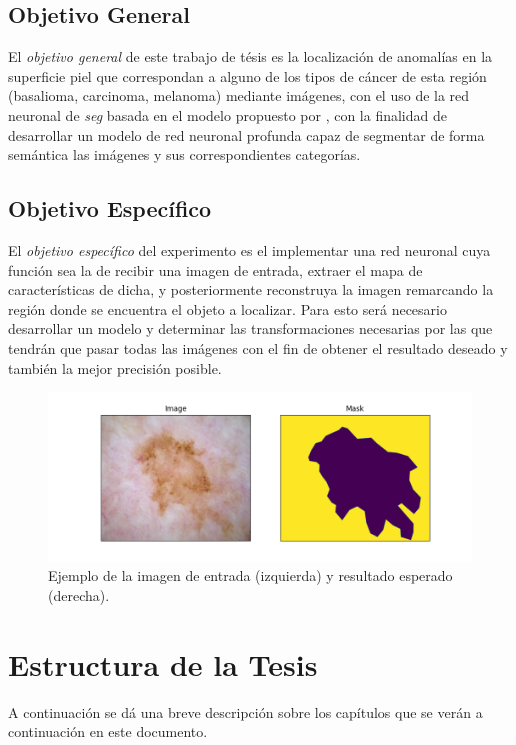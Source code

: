 \subsection{Objetivo General}
El \emph{objetivo general} de este trabajo de tésis es la localización de anomalías en la superficie piel que correspondan a alguno de los tipos de cáncer de esta región (basalioma, carcinoma, melanoma) mediante imágenes, con el uso de la red neuronal de \emph{\gls{seg}} basada en el modelo propuesto por \citet{wu2019fastfcn}, con la finalidad de desarrollar un modelo de red neuronal profunda capaz de segmentar de forma semántica las imágenes y sus correspondientes categorías.
\subsection{Objetivo Específico}
El \emph{objetivo específico} del experimento es el implementar una red neuronal cuya función sea la de recibir una imagen de entrada, extraer el mapa de características de dicha, y posteriormente reconstruya la imagen remarcando la región donde se encuentra el objeto a localizar. Para esto será necesario desarrollar un modelo y determinar las transformaciones necesarias por las que tendrán que pasar todas las imágenes con el fin de obtener el resultado deseado y también la mejor precisión posible.

\begin{figure}[h!]
    \includegraphics[width=150mm]{Figuras/plot_masks.png}
    \centering
    \caption{Ejemplo de la imagen de entrada (izquierda) y resultado esperado (derecha).}
    \label{fig:desired}
\end{figure}

\section{Estructura de la Tesis}

A continuación se dá una breve descripción sobre los capítulos que se verán a continuación en este documento.

